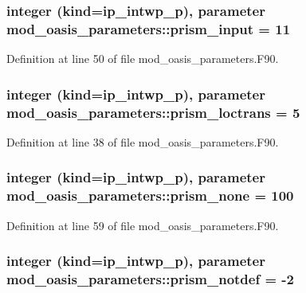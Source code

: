 \hypertarget{classmod__oasis__parameters_aa9009f13473f2cb6476c2fb5e4963243}{
\subsubsection[{prism\+\_\+input}]{\setlength{\rightskip}{0pt plus 5cm}integer (kind=ip\+\_\+intwp\+\_\+p), parameter mod\+\_\+oasis\+\_\+parameters\+::prism\+\_\+input = 11}}\label{classmod__oasis__parameters_aa9009f13473f2cb6476c2fb5e4963243}


Definition at line 50 of file mod\+\_\+oasis\+\_\+parameters.\+F90.

\hypertarget{classmod__oasis__parameters_af9dc530c2cf2f0e5b5bb04fecb8373dd}{
\subsubsection[{prism\+\_\+loctrans}]{\setlength{\rightskip}{0pt plus 5cm}integer (kind=ip\+\_\+intwp\+\_\+p), parameter mod\+\_\+oasis\+\_\+parameters\+::prism\+\_\+loctrans = 5}}\label{classmod__oasis__parameters_af9dc530c2cf2f0e5b5bb04fecb8373dd}


Definition at line 38 of file mod\+\_\+oasis\+\_\+parameters.\+F90.

\hypertarget{classmod__oasis__parameters_a81e4e20be511cd8be2ab3881b42f8f3e}{
\subsubsection[{prism\+\_\+none}]{\setlength{\rightskip}{0pt plus 5cm}integer (kind=ip\+\_\+intwp\+\_\+p), parameter mod\+\_\+oasis\+\_\+parameters\+::prism\+\_\+none = 100}}\label{classmod__oasis__parameters_a81e4e20be511cd8be2ab3881b42f8f3e}


Definition at line 59 of file mod\+\_\+oasis\+\_\+parameters.\+F90.

\hypertarget{classmod__oasis__parameters_aa388f517f0a947f770637d617bdda79b}{
\subsubsection[{prism\+\_\+notdef}]{\setlength{\rightskip}{0pt plus 5cm}integer (kind=ip\+\_\+intwp\+\_\+p), parameter mod\+\_\+oasis\+\_\+parameters\+::prism\+\_\+notdef = -\/2}}\label{classmod__oasis__parameters_aa388f517f0a947f770637d617bdda79b}


